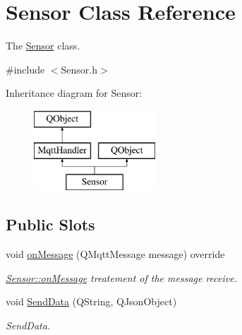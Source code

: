 \hypertarget{classSensor}{}\section{Sensor Class Reference}
\label{classSensor}


The \hyperlink{classSensor}{Sensor} class.  




{\ttfamily \#include $<$Sensor.\+h$>$}

Inheritance diagram for Sensor\+:\begin{figure}[H]
\begin{center}
\leavevmode
\includegraphics[height=3.000000cm]{classSensor}
\end{center}
\end{figure}
\subsection*{Public Slots}
\begin{DoxyCompactItemize}
\item 
void \hyperlink{classSensor_adead6577984a7d6b765897ba001ed176}{on\+Message} (Q\+Mqtt\+Message message) override
\begin{DoxyCompactList}\small\item\em \hyperlink{classSensor_adead6577984a7d6b765897ba001ed176}{Sensor\+::on\+Message} treatement of the message receive. \end{DoxyCompactList}\item 
void \hyperlink{classSensor_acace9ac9768e13174608c9e3649226f6}{Send\+Data} (Q\+String, Q\+Json\+Object)
\begin{DoxyCompactList}\small\item\em Send\+Data. \end{DoxyCompactList}\end{DoxyCompactItemize}
